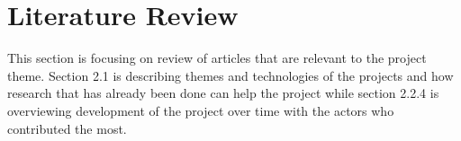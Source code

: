 \section{Literature Review} %
This section is focusing on review of articles that are relevant to the project theme. Section 2.1 is describing themes and technologies of the projects and how research that has already been done can help the project while section 2.2.4 is overviewing development of the project over time with the actors who contributed the most.




